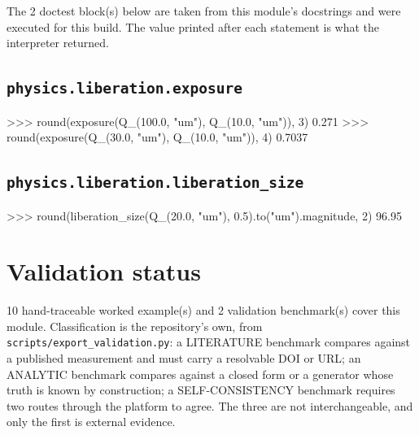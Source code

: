 \documentclass[10pt,a4paper,twoside]{report}
\begin{document}
The 2 doctest block(s) below are taken from this module's docstrings and were executed for this build. The value printed after each statement is what the interpreter returned.

\subsection*{\texttt{physics.liberation.exposure}}

\begin{doctestblock}
>>> round(exposure(Q_(100.0, "um"), Q_(10.0, "um")), 3)
0.271
>>> round(exposure(Q_(30.0, "um"), Q_(10.0, "um")), 4)
0.7037
\end{doctestblock}

\subsection*{\texttt{physics.liberation.liberation\_size}}

\begin{doctestblock}
>>> round(liberation_size(Q_(20.0, "um"), 0.5).to("um").magnitude, 2)
96.95
\end{doctestblock}

\section{Validation status}

10 hand-traceable worked example(s) and 2 validation benchmark(s) cover this module. Classification is the repository's own, from \texttt{scripts/export\_validation.py}: a LITERATURE benchmark compares against a published measurement and must carry a resolvable DOI or URL; an ANALYTIC benchmark compares against a closed form or a generator whose truth is known by construction; a SELF-CONSISTENCY benchmark requires two routes through the platform to agree. The three are not interchangeable, and only the first is external evidence.

\footnotesize
\end{document}
